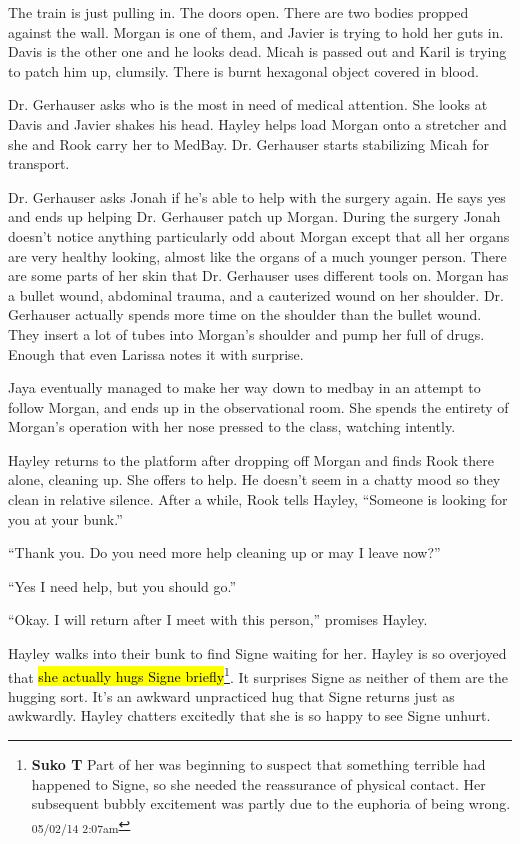 The train is just pulling in.  The doors open.  There are two bodies propped against the wall.  Morgan is one of them, and Javier is trying to hold her guts in.  Davis is the other one and he looks dead.  Micah is passed out and Karil is trying to patch him up, clumsily.  There is burnt hexagonal object covered in blood.



Dr. Gerhauser asks who is the most in need of medical attention.  She looks at Davis and Javier shakes his head.  Hayley helps load Morgan onto a stretcher and she and Rook carry her to MedBay.  Dr. Gerhauser starts stabilizing Micah for transport.



Dr. Gerhauser asks Jonah if he's able to help with the surgery again.  He says yes and ends up helping Dr. Gerhauser patch up Morgan.   During the surgery Jonah doesn't notice anything particularly odd about Morgan except that all her organs are very healthy looking, almost like the organs of a much younger person.  There are some parts of her skin that Dr. Gerhauser uses different tools on.  Morgan has a bullet wound, abdominal trauma, and a cauterized wound on her shoulder.  Dr. Gerhauser actually spends more time on the shoulder than the bullet wound.  They insert a lot of tubes into Morgan's shoulder and pump her full of drugs.  Enough that even Larissa notes it with surprise.



Jaya eventually managed to make her way down to medbay in an attempt to follow Morgan, and ends up in the observational room.  She spends the entirety of Morgan's operation with her nose pressed to the class, watching intently.  



Hayley returns to the platform after dropping off Morgan and finds Rook there alone, cleaning up.  She offers to help.  He doesn't seem in a chatty mood so they clean in relative silence.  After a while, Rook tells Hayley, ``Someone is looking for you at your bunk.''

``Thank you.  Do you need more help cleaning up or may I leave now?''

``Yes I need help, but you should go.''

``Okay.  I will return after I meet with this person,'' promises Hayley.



Hayley walks into their bunk to find Signe waiting for her.  Hayley is so overjoyed that \hl{she actually hugs Signe briefly}\footnote{\textbf{Suko T }Part of her was beginning to suspect that something terrible had happened to Signe, so she needed the reassurance of physical contact.  Her subsequent bubbly excitement was partly due to the euphoria of being wrong. \textsubscript{05/02/14 2:07am}}.  It surprises Signe as neither of them are the hugging sort.  It's an awkward unpracticed hug that Signe returns just as awkwardly.  Hayley chatters excitedly that she is so happy to see Signe unhurt.



